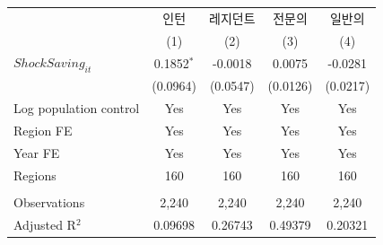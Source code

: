 \begingroup
\centering
\begin{tabular}{lcccc}
   \toprule
                          & 인턴         & 레지던트 & 전문의   & 일반의 \\   
                          & (1)          & (2)      & (3)      & (4)\\  
   \midrule 
   $ShockSaving_{it}$     & 0.1852$^{*}$ & -0.0018  & 0.0075   & -0.0281\\   
                          & (0.0964)     & (0.0547) & (0.0126) & (0.0217)\\   
   Log population control & Yes          & Yes      & Yes      & Yes\\  
   Region FE              & Yes          & Yes      & Yes      & Yes\\  
   Year FE                & Yes          & Yes      & Yes      & Yes\\  
   Regions                & 160          & 160      & 160      & 160\\  
    \\
   Observations           & 2,240        & 2,240    & 2,240    & 2,240\\  
   Adjusted R$^2$         & 0.09698      & 0.26743  & 0.49379  & 0.20321\\  
   \bottomrule
\end{tabular}
\par\endgroup
